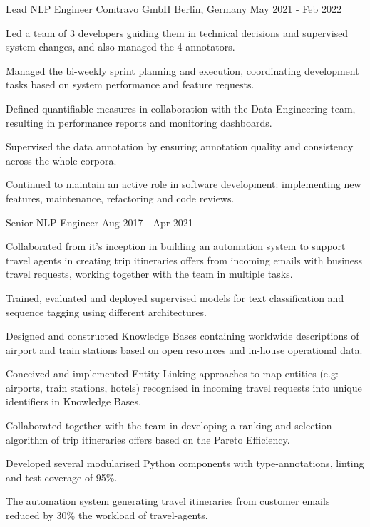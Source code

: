 \begin{cventries}

\cventry
    {Lead NLP Engineer} 
    {Comtravo GmbH} 
    {Berlin, Germany} 
    {May 2021 - Feb 2022}
    {
      \begin{cvitems} 
		  \item {Led a team of 3 developers guiding them in technical decisions and supervised system changes, and also managed the 4 annotators.}
		  \item {Managed the bi-weekly sprint planning and execution, coordinating development tasks based on system performance and feature requests.}
		  \item {Defined quantifiable measures in collaboration with the Data Engineering team, resulting in performance reports and monitoring dashboards.}
		  \item {Supervised the data annotation by ensuring annotation quality and consistency across the whole corpora.}
		  \item {Continued to maintain an active role in software development: implementing new features, maintenance, refactoring and code reviews.}
        \end{cvitems}
 	}


  \cventry
    {Senior NLP Engineer}
    {} %
    {} %
    {Aug 2017 - Apr 2021} %
    {
      \begin{cvitems}
		\item {Collaborated from it's inception in building an automation system to support travel agents in creating trip itineraries offers from incoming emails with business travel requests, working together with the team in multiple tasks.}
		\item {Trained, evaluated and deployed supervised models for text classification and sequence tagging using different architectures.}
		\item {Designed and constructed Knowledge Bases containing worldwide descriptions of airport and train stations based on open resources and in-house operational data.}
		\item {Conceived and implemented Entity-Linking approaches to map entities (e.g: airports, train stations, hotels) recognised in incoming travel requests into unique identifiers in Knowledge Bases.}
		\item {Collaborated together with the team in developing a ranking and selection algorithm of trip itineraries offers based on the Pareto Efficiency.}
		\item {Developed several modularised Python components with type-annotations, linting and test coverage of 95\%.}
		\item {The automation system generating travel itineraries from customer emails reduced by 30\% the workload of travel-agents.}
        \end{cvitems}
 	}


\end{cventries}
